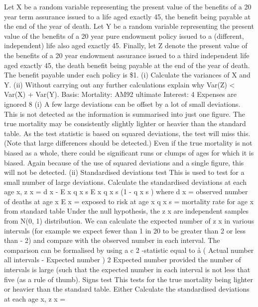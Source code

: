 \documentclass[a4paper,12pt]{article}
\begin{document}
Let X be a random variable representing the present value of the benefits of a 20 year
term assurance issued to a life aged exactly 45, the benefit being payable at the end of
the year of death.
Let Y be a random variable representing the present value of the benefits of a 20 year
pure endowment policy issued to a (different, independent) life also aged exactly 45.
Finally, let Z denote the present value of the benefits of a 20 year endowment
assurance issued to a third independent life aged exactly 45, the death benefit being
payable at the end of the year of death.
The benefit payable under each policy is \$1.
(i) Calculate the variances of X and Y.
(ii) Without carrying out any further calculations explain why
Var(Z) < Var(X) + Var(Y).
Basis: Mortality: AM92 ultimate
Interest: 4%
Expenses are ignored
8
(i)
A few large deviations can be offset by a lot of small deviations. This is not
detected as the information is summarised into just one figure.
The true mortality may be consistently slightly lighter or heavier than the
standard table. As the test statistic is based on squared deviations, the test will
miss this. (Note that large differences should be detected.)
Even if the true mortality is not biased as a whole, there could be significant
runs or clumps of ages for which it is biased. Again because of the use of
squared deviations and a single figure, this will not be detected.
(ii)
Standardised deviations test
This is used to test for a small number of large deviations.
Calculate the standardised deviations at each age x, z x =
d x - E x q x s
E x q x s (1 - q x s )
where
d x = observed number of deaths at age x
E x = exposed to risk at age x
q x s = mortality rate for age x from standard table
Under the null hypothesis, the z x are independent samples from N(0, 1)
distribution.
We can calculate the expected number of z x in various intervals (for example
we expect fewer than 1 in 20 to be greater than 2 or less than - 2) and compare
with the observed number in each interval.
The comparison can be formalised by using a c 2 -statistic equal to
å
( Actual number
all intervals
- Expected number )
2
Expected number
provided the number of intervals is large (such that the expected number in
each interval is not less that five (as a rule of thumb).
Signs test
This tests for the true mortality being lighter or heavier than the standard table.
Either
Calculate the standardised deviations at each age x, z x =
\end{document}
